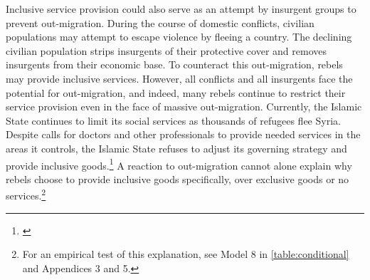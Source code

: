 \documentclass[12pt, letterpaper]{article}
\begin{document}

Inclusive service provision could also serve as an attempt by insurgent groups to prevent out-migration. During the course of domestic conflicts, civilian populations may attempt to escape violence by fleeing a country. The declining civilian population strips insurgents of their protective cover and removes insurgents from their economic base. To counteract this out-migration, rebels may provide inclusive services. However, all conflicts and all insurgents face the potential for out-migration, and indeed, many rebels continue to restrict their service provision even in the face of massive out-migration. Currently, the Islamic State continues to limit its social services as thousands of refugees flee Syria. Despite calls for doctors and other professionals to provide needed services in the areas it controls, the Islamic State refuses to adjust its governing strategy and provide inclusive goods.\footnote{\citealt{is2015}} A reaction to out-migration cannot alone explain why rebels choose to provide inclusive goods specifically, over exclusive goods or no services.\footnote{For an empirical test of this explanation, see Model 8 in \autoref{table:conditional} and Appendices 3 and 5.}
\end{document}
